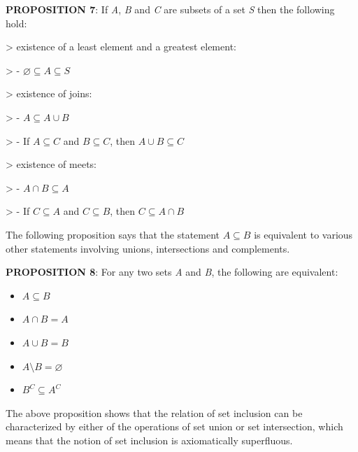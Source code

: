 \textbf{PROPOSITION 7}: If \textit{A}, \textit{B} and \textit{C} are subsets of a set \textit{S} then the following hold:



> existence of a least element and a greatest element:

>    - $\varnothing \subseteq A \subseteq S$



> existence of joins:

>    - $A \subseteq A \cup B$

>    - If $A \subseteq C$ and $B \subseteq C$, then $A \cup B \subseteq C$



> existence of meets:

>    - $A \cap B \subseteq A$

>    - If $C \subseteq A$ and $C \subseteq B$, then $C \subseteq A \cap B$



The following proposition says that the statement $A \subseteq B$ is equivalent to various
other statements involving unions, intersections and complements.



\textbf{PROPOSITION 8}: For any two sets \textit{A} and \textit{B}, the following are equivalent:



\begin{itemize}
    \item $A \subseteq B$
\end{itemize}

\begin{itemize}
    \item $A \cap B = A$
\end{itemize}

\begin{itemize}
    \item $A \cup B = B$
\end{itemize}

\begin{itemize}
    \item $A \setminus B = \varnothing$
\end{itemize}

\begin{itemize}
    \item $B^C \subseteq A^C$
\end{itemize}

The above proposition shows that the relation of set inclusion can be characterized by
either of the operations of set union or set intersection, which means that the notion of
set inclusion is axiomatically superfluous.




